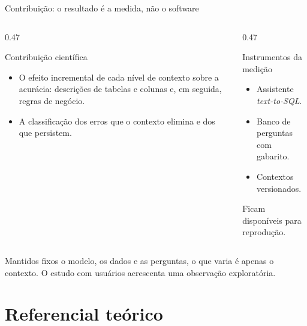 \documentclass[aspectratio=169,10pt]{beamer}
\begin{document}
\begin{frame}{Contribuição: o resultado é a medida, não o software}
  \begin{columns}[T,onlytextwidth]
    \begin{column}{0.47\textwidth}
      \begin{block}{Contribuição científica}
        \begin{itemize}
          \item O efeito incremental de cada nível de contexto sobre a acurácia:
            descrições de tabelas e colunas e, em seguida, regras de negócio.
          \item A classificação dos erros que o contexto elimina e dos que persistem.
        \end{itemize}
      \end{block}
    \end{column}
    \begin{column}{0.47\textwidth}
      \begin{alertblock}{Instrumentos da medição}
        \begin{itemize}
          \item Assistente \textit{text-to-SQL}.
          \item Banco de perguntas com gabarito.
          \item Contextos versionados.
        \end{itemize}
        \vspace{1mm}
        Ficam disponíveis para reprodução.
      \end{alertblock}
    \end{column}
  \end{columns}
  \vspace{4mm}
  Mantidos fixos o modelo, os dados e as perguntas, o que varia é apenas o contexto.
  O estudo com usuários acrescenta uma observação exploratória.
\end{frame}

\section{Referencial teórico}
\end{document}
